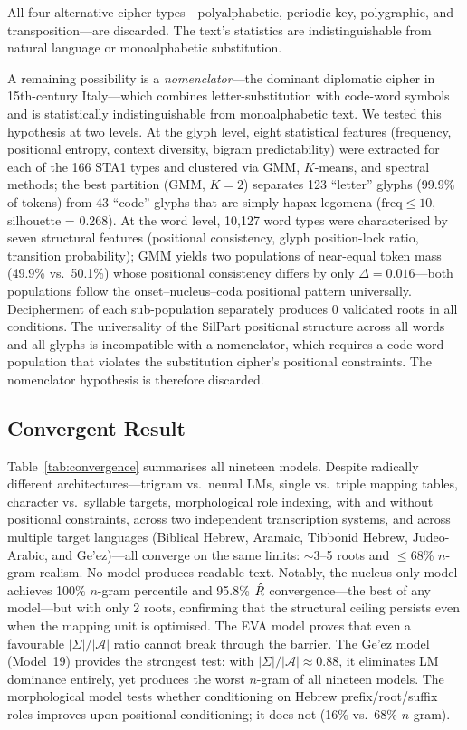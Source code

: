 All four alternative cipher types---polyalphabetic, periodic-key, polygraphic, and transposition---are discarded.  The text's statistics are indistinguishable from natural language or monoalphabetic substitution.

A remaining possibility is a \emph{nomenclator}---the dominant diplomatic cipher in 15th-century Italy---which combines letter-substitution with code-word symbols and is statistically indistinguishable from monoalphabetic text.  We tested this hypothesis at two levels.  At the glyph level, eight statistical features (frequency, positional entropy, context diversity, bigram predictability) were extracted for each of the 166 STA1 types and clustered via GMM, $K$-means, and spectral methods; the best partition (GMM, $K=2$) separates 123 ``letter'' glyphs (99.9\% of tokens) from 43 ``code'' glyphs that are simply hapax legomena ($\text{freq} \leq 10$, silhouette = 0.268).  At the word level, 10{,}127 word types were characterised by seven structural features (positional consistency, glyph position-lock ratio, transition probability); GMM yields two populations of near-equal token mass (49.9\% vs.\ 50.1\%) whose positional consistency differs by only $\Delta = 0.016$---both populations follow the onset--nucleus--coda positional pattern universally.  Decipherment of each sub-population separately produces 0 validated roots in all conditions.  The universality of the SilPart positional structure across all words and all glyphs is incompatible with a nomenclator, which requires a code-word population that violates the substitution cipher's positional constraints.  The nomenclator hypothesis is therefore discarded.

\subsection{Convergent Result}

Table~\ref{tab:convergence} summarises all nineteen models.  Despite radically different architectures---trigram vs.\ neural LMs, single vs.\ triple mapping tables, character vs.\ syllable targets, morphological role indexing, with and without positional constraints, across two independent transcription systems, and across multiple target languages (Biblical Hebrew, Aramaic, Tibbonid Hebrew, Judeo-Arabic, and Ge'ez)---all converge on the same limits: $\sim$3--5 roots and $\leq$68\% $n$-gram realism.  No model produces readable text.  Notably, the nucleus-only model achieves 100\% $n$-gram percentile and 95.8\% $\hat{R}$ convergence---the best of any model---but with only 2 roots, confirming that the structural ceiling persists even when the mapping unit is optimised.  The EVA model proves that even a favourable $|\Sigma|/|\mathcal{A}|$ ratio cannot break through the barrier.  The Ge'ez model (Model~19) provides the strongest test: with $|\Sigma|/|\mathcal{A}| \approx 0.88$, it eliminates LM dominance entirely, yet produces the worst $n$-gram of all nineteen models.  The morphological model tests whether conditioning on Hebrew prefix/root/suffix roles improves upon positional conditioning; it does not (16\% vs.\ 68\% $n$-gram).

